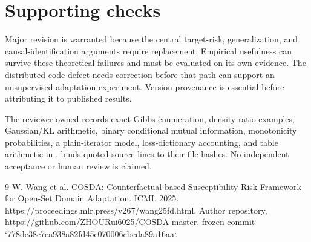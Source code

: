 \documentclass[10pt]{article}
\begin{document}
\section*{Supporting checks}
Major revision is warranted because the central target-risk, generalization, and causal-identification arguments require replacement. Empirical usefulness can survive these theoretical failures and must be evaluated on its own evidence. The distributed code defect needs correction before that path can support an unsupervised adaptation experiment. Version provenance is essential before attributing it to published results.\par
The reviewer-owned records exact Gibbs enumeration, density-ratio examples, Gaussian/KL arithmetic, binary conditional mutual information, monotonicity probabilities, a plain-iterator model, loss-dictionary accounting, and table arithmetic in . binds quoted source lines to their file hashes. No independent acceptance or human review is claimed.\par
9 W. Wang et al. COSDA: Counterfactual-based Susceptibility Risk Framework for Open-Set Domain Adaptation. ICML 2025. https://proceedings.mlr.press/v267/wang25fd.html. Author repository, https://github.com/ZHOURui6025/COSDA-master, frozen commit `778de38c7ea938a82fd45e070006cbeda89a16aa`.\par
\end{document}
